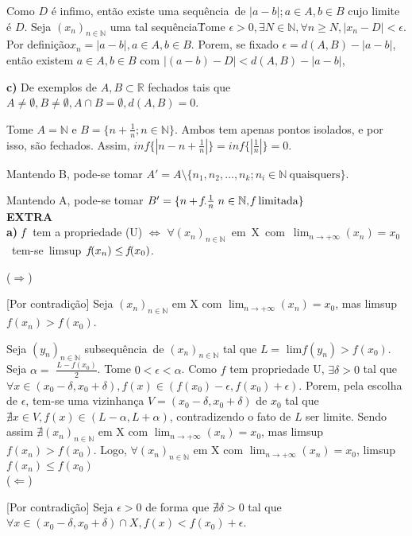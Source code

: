 \documentclass[12pt,twoside]{article}
\newcommand{\defi}{definição}
\newcommand{\ent}{então }
\newcommand{\eh}{é }
\newcommand{\seq}{sequência}
\newcommand{\sao}{são }
\newcommand{\contradicao}{contradição}
\newcommand{\limi}[2]{$\displaystyle{\lim_{n \to +\infty}}(#1)=#2$}
\newcommand{\f}{\mkern-2mu f\mkern-3mu}
\newcommand{\R}{\mathbb{R}}
\newcommand{\N}{\mathbb{N}}
\begin{document}
	Como $D$ \eh infimo, \ent existe uma \seq\ de ${|a-b|; a\in A, b\in B}$ cujo limite \eh $D$. Seja $(x_n)_{n\in\N}$ uma tal \seq\. Tome $\epsilon>0,\exists N \in \N, \forall n \ge N, |x_n - D| < \epsilon$. Por \defi $x_n = |a-b|, a\in A, b\in B$. Porem, se fixado $\epsilon = d(A,B) - |a-b|$, \ent existem $a\in A, b\in B$ com $|(a-b)-D| < d(A,B) - |a-b|$, 

	\noindent\textbf{c)} De exemplos de $A,B \subset \R$ fechados tais que $A \neq \emptyset, B \neq \emptyset, A\cap B = \emptyset, d(A,B) = 0$.

	Tome $A = \mathbb{N}$ e $B = \{n + \frac{1}{n}; n \in \N\}$. Ambos tem apenas pontos isolados, e por isso, \sao fechados. Assim, $inf\{|n - n + \frac{1}{n}|\} = inf\{|\frac{1}{n}|\} = 0$.
	
	Mantendo B, pode-se tomar $A' = A \setminus \{n_1, n_2, \ldots, n_k; n_i \in \N\ \text{quaisquers}\}$.
	
	Mantendo A, pode-se tomar $B' = \{n + \f . \frac{1}{n}\; n \in \N, \f \text{ limitada}\}$\\
	
	
	\noindent\textbf{EXTRA}\\
	
	
	\noindent\textbf{a)} $\f\;$ tem a propriedade (U) $\iff$ \hbox{$\forall (x_n)_{n\in\N}$ em X com \limi{x_n}{x_0} tem-se limsup $\f (x_n) \leq \f (x_0)$}.
	
	($\Rightarrow$)
	
	[Por \contradicao] Seja $(x_n)_{n\in\N}$ em X com \limi{x_n}{x_0}, mas \hbox{limsup $f(x_n) > f(x_0)$}.
	
	Seja $(y_n)_{n\in\N}$ sub\seq\ de $(x_n)_{n\in\N}$ tal que $L =$ lim$f(y_n) > f(x_0)$. Seja $\alpha =$ $\frac{L - f(x_0)}{2}$. Tome $0 < \epsilon < \alpha$. Como $f$ tem propriedade U, $\exists \delta > 0$ tal que $\forall x \in (x_0 - \delta, x_0 + \delta), f(x) \in (f(x_0) - \epsilon, f(x_0) + \epsilon)$. Porem, pela escolha de $\epsilon$, tem-se uma vizinhança $V=(x_0 - \delta, x_0 + \delta)$ de $x_0$ tal que $\nexists x \in V, f(x) \in (L - \alpha, L + \alpha)$, contradizendo o fato de $L$ ser limite. Sendo assim $\nexists (x_n)_{n\in\N}$ em X com \limi{x_n}{x_0}, mas \hbox{limsup $f(x_n) > f(x_0)$}. Logo, $\forall (x_n)_{n\in\N}$ em X com \limi{x_n}{x_0}, \hbox{limsup $f(x_n) \leq f(x_0)$} \\
	
	
	($\Leftarrow$)
	
	[Por \contradicao] Seja $\epsilon > 0$ de forma que $\nexists \delta > 0$ tal que \hbox{$\forall x \in (x_0 - \delta, x_0 + \delta)\cap X, f(x) < f(x_0) + \epsilon$}.
	
\end{document}
